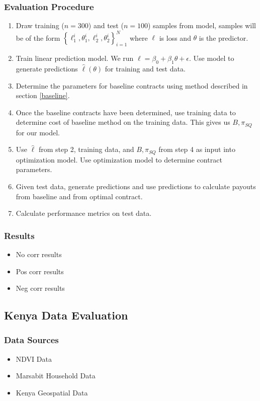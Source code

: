 \documentclass[11pt]{article}
\begin{document}
    \subsubsection{Evaluation Procedure}
        \begin{enumerate}
            \item Draw training ($n=300$) and test ($n=100$) samples from model, samples will be of the form $\left \{\ell^i_1,\theta^i_1, \ell^i_2, \theta^i_2 \right \}_{i=1}^N$ where $\ell$ is loss and $\theta$ is the predictor. 
            \item Train linear prediction model. We run $\ell = \beta_0 + \beta_1\theta +\epsilon$. Use model to generate predictions $\hat{\ell}(\theta)$ for training and test data. 
            \item Determine the parameters for baseline contracts using method described in section \ref{baseline}. 
            \item Once the baseline contracts have been determined, use training data to determine cost of baseline method on the training data. This gives us $B,\pi_{SQ}$ for our model. 
            \item Use $\hat{\ell}$ from step 2, training data, and $B, \pi_{SQ}$ from step 4 as input into optimization model. Use optimization  model to determine contract parameters. 
            \item Given test data, generate predictions and use predictions to calculate payouts from baseline and from optimal contract. 
            \item Calculate performance metrics on test data. 
        \end{enumerate}

    \subsubsection{Results}
      \begin{itemize}
          \item No corr results 
          \item Pos corr results 
          \item Neg corr results
      \end{itemize}

  \subsection{Kenya Data Evaluation}
    \subsubsection{Data Sources}
      \begin{itemize}
          \item NDVI Data 
          \item Marsabit Household Data 
          \item Kenya Geospatial Data 
      \end{itemize}
      
\end{document}

